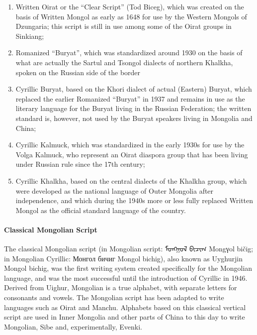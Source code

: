 \begin{enumerate}
\item Written Oirat or the “Clear Script” (Tod Biceg), which was created on the basis of
Written Mongol as early as 1648 for use by the Western Mongols of Dzungaria; this
script is still in use among some of the Oirat groups in Sinkiang;

\item Romanized “Buryat”, which was standardized around 1930 on the basis of what are
actually the Sartul and Tsongol dialects of northern Khalkha, spoken on the Russian
side of the border

\item Cyrillic Buryat, based on the Khori dialect of actual (Eastern) Buryat, which replaced
the earlier Romanized “Buryat” in 1937 and remains in use as the literary language
for the Buryat living in the Russian Federation; the written standard is, however, not
used by the Buryat speakers living in Mongolia and China;

\item Cyrillic Kalmuck, which was standardized in the early 1930s for use by the Volga
Kalmuck, who represent an Oirat diaspora group that has been living under Russian
rule since the 17th century;

\item Cyrillic Khalkha, based on the central dialects of the Khalkha group, which were
developed as the national language of Outer Mongolia after independence, and
which during the 1940s more or less fully replaced Written Mongol as the official
standard language of the country.
\end{enumerate}

\paragraph{Classical Mongolian Script} The classical Mongolian script (in Mongolian script: {\mongolian  ᠮᠣᠩᠭᠣᠯ ᠪᠢᠴᠢᠭ᠌} Mongγol bičig; in Mongolian Cyrillic: Монгол бичиг Mongol bichig), also known as Uyghurjin Mongol bichig, was the first writing system created specifically for the Mongolian language, and was the most successful until the introduction of Cyrillic in 1946. Derived from Uighur, Mongolian is a true alphabet, with separate letters for consonants and vowels. The Mongolian script has been adapted to write languages such as Oirat and Manchu. Alphabets based on this classical vertical script are used in Inner Mongolia and other parts of China to this day to write Mongolian, Sibe and, experimentally, Evenki.
\medskip

